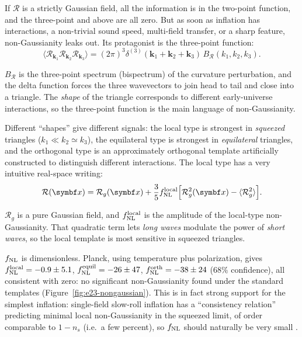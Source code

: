 If \(\mathcal R\) is a strictly Gaussian field, all the information is in the two-point function, and the three-point and above are all zero. But as soon as inflation has interactions, a non-trivial sound speed, multi-field transfer, or a sharp feature, non-Gaussianity leaks out. Its protagonist is the three-point function:
\begin{equation}
  \langle\mathcal R_{\bm k_1}\mathcal R_{\bm k_2}\mathcal R_{\bm k_3}\rangle
  =(2\pi)^3\delta^{(3)}(\bm k_1+\bm k_2+\bm k_3)\,B_{\mathcal R}(k_1,k_2,k_3) .
  \label{eq:e23-bispectrum}
\end{equation}
\begin{formulaexplain}
\(B_{\mathcal R}\) is the three-point spectrum (bispectrum) of the curvature perturbation, and the delta function forces the three wavevectors to join head to tail and close into a triangle. The \emph{shape} of the triangle corresponds to different early-universe interactions, so the three-point function is the main language of non-Gaussianity.
\end{formulaexplain}
Different ``shapes'' give different signals: the local type is strongest in \emph{squeezed} triangles (\(k_1\ll k_2\simeq k_3\)), the equilateral type is strongest in \emph{equilateral} triangles, and the orthogonal type is an approximately orthogonal template artificially constructed to distinguish different interactions. The local type has a very intuitive real-space writing:
\begin{equation}
  \mathcal R(\bm x)=\mathcal R_g(\bm x)+\frac{3}{5}f^{\rm local}_{\rm NL}
  \Bigl[\mathcal R_g^2(\bm x)-\langle\mathcal R_g^2\rangle\Bigr] .
  \label{eq:e23-local-fnl}
\end{equation}
\begin{formulaexplain}
\(\mathcal R_g\) is a pure Gaussian field, and \(f^{\rm local}_{\rm NL}\) is the amplitude of the local-type non-Gaussianity. That quadratic term lets \emph{long waves} modulate the power of \emph{short waves}, so the local template is most sensitive in squeezed triangles.
\end{formulaexplain}
\(f_{\rm NL}\) is dimensionless. Planck, using temperature plus polarization, gives \(f^{\rm local}_{\rm NL}=-0.9\pm5.1\), \(f^{\rm equil}_{\rm NL}=-26\pm47\), \(f^{\rm orth}_{\rm NL}=-38\pm24\) (\(68\%\) confidence), all consistent with zero: no significant non-Gaussianity found under the standard templates (Figure~\ref{fig:e23-nongaussian}). This is in fact strong support for the simplest inflation: single-field slow-roll inflation has a ``consistency relation'' predicting minimal local non-Gaussianity in the squeezed limit, of order comparable to \(1-n_s\) (i.e.\ a few percent), so \(f_{\rm NL}\) should naturally be very small \citep{2003JHEP...05..013M,2020A&A...641A...9P,2020A&A...641A..10P}.

